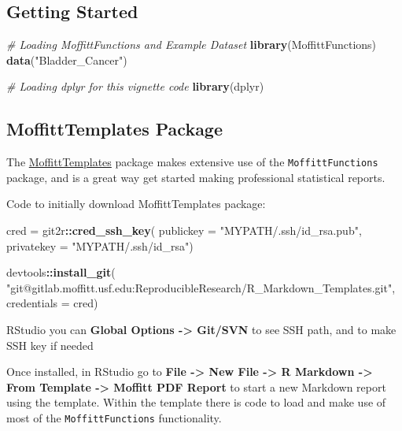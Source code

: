\documentclass[table]{article}
\newenvironment{Shaded}{\begin{snugshade}}{\end{snugshade}}
\newcommand{\CommentTok}[1]{\textcolor[rgb]{0.56,0.35,0.01}{\textit{#1}}}
\newcommand{\DataTypeTok}[1]{\textcolor[rgb]{0.13,0.29,0.53}{#1}}
\newcommand{\KeywordTok}[1]{\textcolor[rgb]{0.13,0.29,0.53}{\textbf{#1}}}
\newcommand{\NormalTok}[1]{#1}
\newcommand{\OperatorTok}[1]{\textcolor[rgb]{0.81,0.36,0.00}{\textbf{#1}}}
\newcommand{\StringTok}[1]{\textcolor[rgb]{0.31,0.60,0.02}{#1}}
\begin{document}
\hypertarget{getting-started}{%
\subsection{Getting Started}\label{getting-started}}

\begin{Shaded}
\begin{Highlighting}[]
\CommentTok{# Loading MoffittFunctions and Example Dataset}
\KeywordTok{library}\NormalTok{(MoffittFunctions)}
\KeywordTok{data}\NormalTok{(}\StringTok{"Bladder_Cancer"}\NormalTok{)}

\CommentTok{# Loading dplyr for this vignette code}
\KeywordTok{library}\NormalTok{(dplyr)}
\end{Highlighting}
\end{Shaded}

\hypertarget{moffitttemplates-package}{%
\subsection{MoffittTemplates Package}\label{moffitttemplates-package}}

The
\href{https://gitlab.moffitt.usf.edu:8000/ReproducibleResearch/R_Markdown_Templates}{MoffittTemplates}
package makes extensive use of the \texttt{MoffittFunctions} package,
and is a great way get started making professional statistical reports.

Code to initially download MoffittTemplates package:

\begin{Shaded}
\begin{Highlighting}[]
\NormalTok{cred =}\StringTok{ }\NormalTok{git2r}\OperatorTok{::}\KeywordTok{cred_ssh_key}\NormalTok{(}
    \DataTypeTok{publickey =} \StringTok{"MYPATH/.ssh/id_rsa.pub"}\NormalTok{, }
    \DataTypeTok{privatekey =} \StringTok{"MYPATH/.ssh/id_rsa"}\NormalTok{)}

\NormalTok{devtools}\OperatorTok{::}\KeywordTok{install_git}\NormalTok{(}
  \StringTok{"git@gitlab.moffitt.usf.edu:ReproducibleResearch/R_Markdown_Templates.git"}\NormalTok{, }
  \DataTypeTok{credentials =}\NormalTok{ cred)}
\end{Highlighting}
\end{Shaded}

RStudio you can \textbf{Global Options -\textgreater{} Git/SVN} to see
SSH path, and to make SSH key if needed

Once installed, in RStudio go to \textbf{File -\textgreater{} New File
-\textgreater{} R Markdown -\textgreater{} From Template -\textgreater{}
Moffitt PDF Report} to start a new Markdown report using the template.
Within the template there is code to load and make use of most of the
\texttt{MoffittFunctions} functionality.
\end{document}
